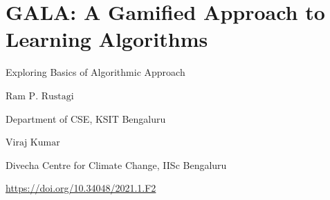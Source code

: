 \chapter{GALA: A Gamified Approach to Learning Algorithms}

\vskip -12pt

\centerline{{\LARGE Exploring Basics of Algorithmic Approach}}

\vskip 0.8cm

\begin{center}
{\large\uppercase{$\text{Ram P. Rustagi}$}} 

\vskip -6pt

Department of CSE, KSIT Bengaluru

\end{center}

\vskip 1cm

\begin{center}
{\large\uppercase{$\text{Viraj Kumar}$}} 

\vskip -6pt

Divecha Centre for Climate Change, IISc Bengaluru

\end{center}


\vspace{2cm}

\centerline{\url{https://doi.org/10.34048/2021.1.F2}}

\vfill



\newpage

